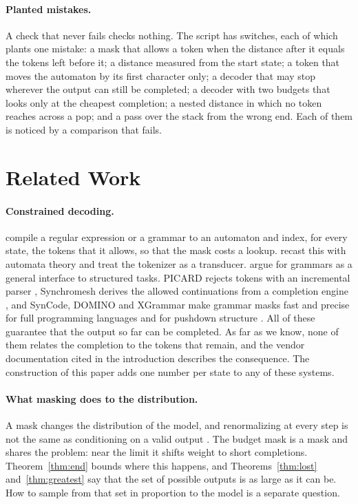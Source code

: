 \documentclass[acmsmall,nonacm,screen]{acmart}
\newcommand{\claim}[2]{#2}
\begin{document}
\paragraph{Planted mistakes.} A check that never fails checks nothing. The script has
\exMutants{} switches, each of which plants one mistake: a mask that allows a token when the
distance after it equals the tokens left before it; a distance measured from the start
state; a token that moves the automaton by its first character only; a decoder that may stop
wherever the output can still be completed; a decoder with two budgets that looks only at
the cheapest completion; a nested distance in which no token reaches
across a pop; and a pass over the stack from the wrong end. \claim{all-noticed}{Each of them
is noticed by a comparison that fails.}

\section{Related Work}\label{sec:related}

\paragraph{Constrained decoding.} \citet{Willard2023} compile a regular expression or a
grammar to an automaton and index, for every state, the tokens that it allows, so that the
mask costs a lookup. \citet{Koo2024} recast this with automata theory and treat the
tokenizer as a transducer. \citet{Geng2023} argue for grammars as a general interface to
structured tasks. PICARD rejects tokens with an incremental parser \citep{Scholak2021},
Synchromesh derives the allowed continuations from a completion engine
\citep{Poesia2022}, and SynCode, DOMINO and XGrammar make grammar masks fast and precise for
full programming languages and for pushdown structure
\citep{Ugare2024,BeurerKellner2024,Dong2024}. All of these guarantee that the output so far
can be completed. As far as we know, none of them relates the completion to the tokens that
remain, and the vendor documentation cited in the introduction describes the consequence.
The construction of this paper adds one number per state to any of these systems.

\paragraph{What masking does to the distribution.} A mask changes the distribution of the
model, and renormalizing at every step is not the same as conditioning on a valid output
\citep{Park2024}. The budget mask is a mask and shares the problem: near the limit it
shifts weight to short completions. Theorem~\ref{thm:end} bounds where this happens, and
Theorems~\ref{thm:lost} and~\ref{thm:greatest} say that the set of possible outputs is as
large as it can be. How to sample from that set in proportion to the model is a separate
question.
\end{document}
